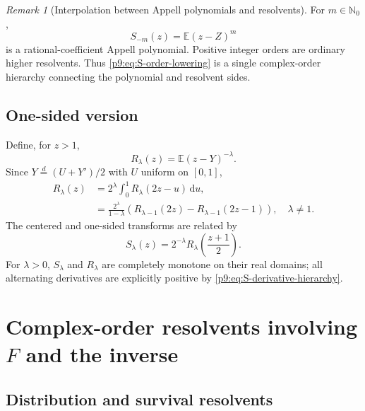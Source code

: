 \documentclass[11pt,oneside]{article}
\theoremstyle{definition}
\theoremstyle{remark}
\newtheorem{remark}[theorem]{Remark}
\newcommand{\E}{\mathbb E}
\newcommand{\N}{\mathbb N}
\newcommand{\dd}{\,\mathrm d}
\newcommand{\1}{\mathbf 1}
\begin{document}
\begin{remark}[Interpolation between Appell polynomials and resolvents]
For $m\in\N_0$,
\begin{equation}
 S_{-m}(z)=\E(z-Z)^m
 \label{p9:eq:S-negative-polynomial}
\end{equation}
is a rational-coefficient Appell polynomial.  Positive integer orders are
ordinary higher resolvents.  Thus \cref{p9:eq:S-order-lowering} is a single
complex-order hierarchy connecting the polynomial and resolvent sides.
\end{remark}

\subsection{One-sided version}

Define, for $z>1$,
\begin{equation}
 R_\lambda(z)=\E(z-Y)^{-\lambda}.
 \label{p9:eq:R-lambda}
\end{equation}
Since $Y\overset d=(U+Y')/2$ with $U$ uniform on $[0,1]$,
\begin{align}
 R_\lambda(z)
 &=2^\lambda\int_0^1R_\lambda(2z-u)\dd u,
 \label{p9:eq:R-integral-refinement}\\
 &=\frac{2^\lambda}{1-\lambda}
   \left(R_{\lambda-1}(2z)-R_{\lambda-1}(2z-1)\right),
 \quad \lambda\ne1.
 \label{p9:eq:R-order-lowering}
\end{align}
The centered and one-sided transforms are related by
\begin{equation}
 S_\lambda(z)=2^{-\lambda}
 R_\lambda\!\left(\frac{z+1}{2}\right).
 \label{p9:eq:S-R-relation}
\end{equation}
For $\lambda>0$, $S_\lambda$ and $R_\lambda$ are completely monotone on their
real domains; all alternating derivatives are explicitly positive by
\cref{p9:eq:S-derivative-hierarchy}.

\section{Complex-order resolvents involving \texorpdfstring{$F$}{F} and the inverse}
\label{p9:sec:complex-resolvents}

\subsection{Distribution and survival resolvents}
\end{document}
